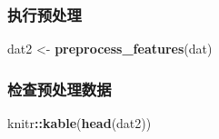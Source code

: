 \documentclass[
]{article}
\newenvironment{Shaded}{\begin{snugshade}}{\end{snugshade}}
\newcommand{\FunctionTok}[1]{\textcolor[rgb]{0.13,0.29,0.53}{\textbf{#1}}}
\newcommand{\NormalTok}[1]{#1}
\newcommand{\OtherTok}[1]{\textcolor[rgb]{0.56,0.35,0.01}{#1}}
\newcommand{\SpecialCharTok}[1]{\textcolor[rgb]{0.81,0.36,0.00}{\textbf{#1}}}
\begin{document}
\subsubsection{执行预处理}\label{ux6267ux884cux9884ux5904ux7406}

\begin{Shaded}
\begin{Highlighting}[]
\NormalTok{dat2 }\OtherTok{\textless{}{-}} \FunctionTok{preprocess\_features}\NormalTok{(dat)}
\end{Highlighting}
\end{Shaded}

\subsubsection{检查预处理数据}\label{ux68c0ux67e5ux9884ux5904ux7406ux6570ux636e}

\begin{Shaded}
\begin{Highlighting}[]
\NormalTok{knitr}\SpecialCharTok{::}\FunctionTok{kable}\NormalTok{(}\FunctionTok{head}\NormalTok{(dat2))}
\end{Highlighting}
\end{Shaded}
\end{document}
